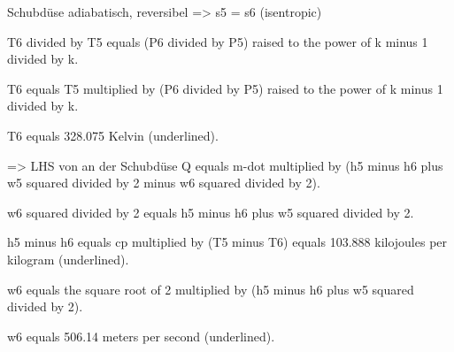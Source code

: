 Schubdüse adiabatisch, reversibel  
=> s5 = s6 (isentropic)  

T6 divided by T5 equals (P6 divided by P5) raised to the power of k minus 1 divided by k.  

T6 equals T5 multiplied by (P6 divided by P5) raised to the power of k minus 1 divided by k.  

T6 equals 328.075 Kelvin (underlined).  

=> LHS von an der Schubdüse  
Q equals m-dot multiplied by (h5 minus h6 plus w5 squared divided by 2 minus w6 squared divided by 2).  

w6 squared divided by 2 equals h5 minus h6 plus w5 squared divided by 2.  

h5 minus h6 equals cp multiplied by (T5 minus T6) equals 103.888 kilojoules per kilogram (underlined).  

w6 equals the square root of 2 multiplied by (h5 minus h6 plus w5 squared divided by 2).  

w6 equals 506.14 meters per second (underlined).